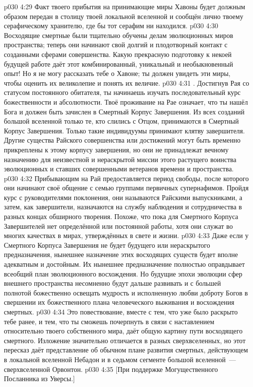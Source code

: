 \vs p030 4:29 Факт твоего прибытия на принимающие миры Хавоны будет должным образом передан в столицу твоей локальной вселенной и сообщён лично твоему серафическому хранителю, где бы тот серафим ни находился.
\vs p030 4:30 Восходящие смертные были тщательно обучены делам эволюционных миров пространства; теперь они начинают свой долгий и плодотворный контакт с созданными сферами совершенства. Какую прекрасную подготовку к некоей будущей работе даёт этот комбинированный, уникальный и необыкновенный опыт! Но я не могу рассказать тебе о Хавоне; ты должен увидеть эти миры, чтобы оценить их великолепие и понять их величие.
\vs p030 4:31 . Достигнув Рая со статусом постоянного обитателя, ты начинаешь изучать последовательный курс божественности и абсолютности. Твоё проживание на Рае означает, что ты нашёл Бога и должен быть зачислен в Смертный Корпус Завершения. Из всех созданий большой вселенной только те, кто слились с Отцом, принимаются в Смертный Корпус Завершения. Только такие индивидуумы принимают клятву завершителя. Другие существа Райского совершенства или достижений могут быть временно прикреплены к этому корпусу завершения, но они не принадлежат вечному назначению для неизвестной и нераскрытой миссии этого растущего воинства эволюционных и ставших совершенными ветеранов времени и пространства.
\vs p030 4:32 Прибывающим на Рай предоставляется период свободы, после которого они начинают своё общение с семью группами первичных супернафимов. Пройдя курс с руководителями поклонения, они называются Райскими выпускниками, а затем, как завершители, назначаются на службу наблюдения и сотрудничества в разных концах обширного творения. Похоже, что пока для Смертного Корпуса Завершителей нет определённой или постоянной работы, хотя они служат во многих качествах в мирах, утверждённых в свете и жизни.
\vs p030 4:33 Даже если у Смертного Корпуса Завершения не будет будущего или нераскрытого предназначения, нынешнее назначение этих восходящих существ будет вполне адекватным и достойным. Их нынешнее предназначение полностью оправдывает всеобщий план эволюционного восхождения. Но будущие эпохи эволюции сфер внешнего пространства несомненно будут дальше развивать и с большей полнотой божественно освещать мудрость и исполненную любви доброту Богов в свершении их божественного плана человеческого выживания и восхождения смертных.
\vs p030 4:34 \pc Это повествование, вместе с тем, что уже было раскрыто тебе ранее, и тем, что ты сможешь почерпнуть в связи с наставлением относительно твоего собственного мира, даёт общую картину пути восходящего смертного. Изложение значительно отличается в разных сверхвселенных, но этот пересказ даёт представление об обычном плане развития смертных, действующем в локальной вселенной Небадон и в седьмом сегменте большой вселенной~--- сверхвселенной Орвонтон.
\vsetoff
\vs p030 4:35 [При поддержке Могущественного Посланника из Уверсы.]
\quizlink

